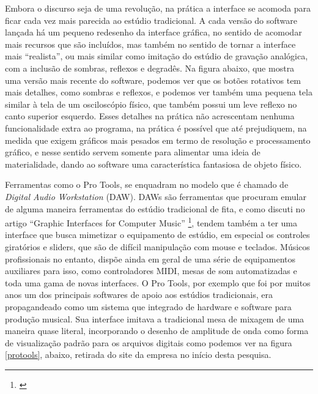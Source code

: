 Embora o discurso seja de uma revolução, na prática a interface se acomoda para ficar cada vez mais parecida ao estúdio tradicional. A cada versão do software lançada há um pequeno redesenho da interface gráfica, no sentido de acomodar mais recursos que são incluídos, mas também no sentido de tornar a interface mais “realista”, ou mais similar como imitação do estúdio de gravação analógica, com a inclusão de sombras, reflexos e degradês. Na figura abaixo, que mostra uma versão mais recente do software, podemos ver que os botões rotativos tem mais detalhes, como sombras e reflexos, e podemos ver também uma pequena tela similar à tela de um osciloscópio físico, que também possui um leve reflexo no canto superior esquerdo. Esses detalhes na prática não acrescentam nenhuma funcionalidade extra ao programa, na prática é possível que até prejudiquem, na medida que exigem gráficos mais pesados em termo de resolução e processamento gráfico, e nesse sentido servem somente para alimentar uma ideia de materialidade, dando ao software uma característica fantasiosa de objeto físico. 

Ferramentas como o Pro Tools, se enquadram no modelo que é chamado de \emph{Digital Audio Workstation} (DAW). DAWs são ferramentas que procuram emular de alguma maneira ferramentas do estúdio tradicional de fita, e como discuti no artigo ``Graphic Interfaces for Computer Music'' \footnote{\cite{Stolfi2016}}, tendem também a ter uma interface que busca mimetizar o equipamento de estúdio, em especial os controles giratórios e sliders, que são de difícil manipulação com mouse e teclados. Músicos profissionais no entanto, dispõe ainda em geral de uma série de equipamentos auxiliares para isso, como controladores MIDI, mesas de som automatizadas e toda uma gama de novas interfaces. O Pro Tools, por exemplo que foi por muitos anos um dos principais softwares de apoio aos estúdios tradicionais, era propagandeado como um sistema que integrado de hardware e software para produção musical. Sua interface imitava a tradicional mesa de mixagem de uma maneira quase literal, incorporando o desenho de amplitude de onda como forma de visualização padrão para os arquivos digitais como podemos ver na figura \ref{protools}, abaixo, retirada do site da empresa no início desta pesquisa.


